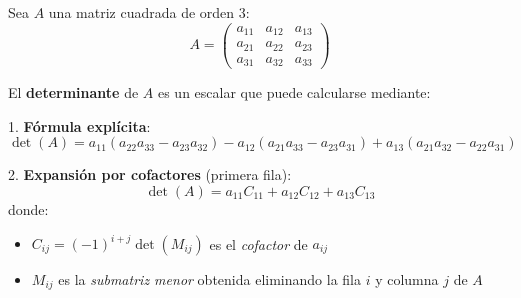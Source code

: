 \begin{definition}
\label{def:det3x3}
Sea $A$ una matriz cuadrada de orden $3$:
\[
A = \begin{pmatrix}
a_{11} & a_{12} & a_{13} \\
a_{21} & a_{22} & a_{23} \\
a_{31} & a_{32} & a_{33}
\end{pmatrix}
\]

El \textbf{determinante} de $A$ es un escalar que puede calcularse mediante:

1. \textbf{Fórmula explícita}:
\begin{equation}
\det(A) = a_{11}(a_{22}a_{33} - a_{23}a_{32}) - a_{12}(a_{21}a_{33} - a_{23}a_{31}) + a_{13}(a_{21}a_{32} - a_{22}a_{31})
\end{equation}

2. \textbf{Expansión por cofactores} (primera fila):
\begin{equation}
\det(A) = a_{11}C_{11} + a_{12}C_{12} + a_{13}C_{13}
\end{equation}
donde:
\begin{itemize}
\item $C_{ij} = (-1)^{i+j} \det(M_{ij})$ es el \textit{cofactor} de $a_{ij}$
\item $M_{ij}$ es la \textit{submatriz menor} obtenida eliminando la fila $i$ y columna $j$ de $A$
\end{itemize}
\end{definition}

